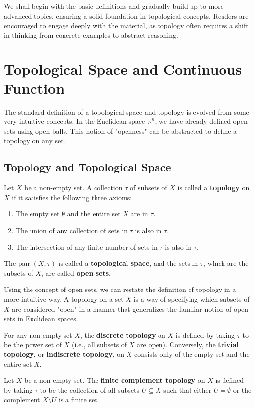 We shall begin with the basic definitions and gradually build up to more advanced topics, ensuring a solid foundation in topological concepts. Readers are encouraged to engage deeply with the material, as topology often requires a shift in thinking from concrete examples to abstract reasoning.

\section{Topological Space and Continuous Function}

The standard definition of a topological space and topology is evolved from some very intuitive concepts. In the Euclidean space $\mathbb{R}^n$, we have already defined open sets using open balls. This notion of "openness" can be abstracted to define a topology on any set.

\subsection{Topology and Topological Space}

\begin{definition}[Topology]
Let $X$ be a non-empty set. A collection $\tau$ of subsets of $X$ is called a \textbf{topology} on $X$ if it satisfies the following three axioms:
\begin{enumerate}
    \item The empty set $\emptyset$ and the entire set $X$ are in $\tau$.
    \item The union of any collection of sets in $\tau$ is also in $\tau$.
    \item The intersection of any finite number of sets in $\tau$ is also in $\tau$.
\end{enumerate}
The pair $(X, \tau)$ is called a \textbf{topological space}, and the sets in $\tau$, which are the subsets of $X$, are called \textbf{open sets}.
\end{definition}

Using the concept of open sets, we can restate the definition of topology in a more intuitive way. A topology on a set $X$ is a way of specifying which subsets of $X$ are considered "open" in a manner that generalizes the familiar notion of open sets in Euclidean spaces.

\begin{definition}
For any non-empty set $X$, the \textbf{discrete topology} on $X$ is defined by taking $\tau$ to be the power set of $X$ (i.e., all subsets of $X$ are open). Conversely, the \textbf{trivial topology}, or \textbf{indiscrete topology}, on $X$ consists only of the empty set and the entire set $X$.

Let $X$ be a non-empty set. The \textbf{finite complement topology} on $X$ is defined by taking $\tau$ to be the collection of all subsets $U \subseteq X$ such that either $U = \emptyset$ or the complement $X \setminus U$ is a finite set.
\end{definition}


